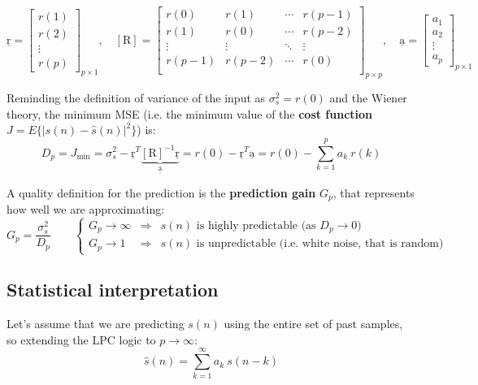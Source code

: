 \[ \underline{\mathrm{r}} = \left[
\begin{array}{c}
    r(1) \\
    r(2) \\
    \vdots \\
    r(p)
\end{array} \right]_{p \times 1}, \quad \left[\mathrm{R}\right] = \left[
\begin{array}{cccc}
    r(0) & r(1) & \cdots & r(p-1) \\
    r(1) & r(0) & \cdots & r(p-2) \\
    \vdots & \vdots & \ddots & \vdots \\
    r(p-1) & r(p-2) & \cdots & r(0) \\
\end{array} \right]_{p \times p}, \quad \underline{\mathrm{a}} = \left[
\begin{array}{c}
    a_1 \\
    a_2 \\
    \vdots \\
    a_p
\end{array} \right]_{p \times 1} \]

Reminding the definition of variance of the input as $ \sigma_s^2 = r(0) $ and the Wiener theory, the minimum MSE (i.e. the minimum value of the \textbf{cost function} $J = E\{|s(n) - \hat{s}(n)|^2\}$) is:
\[ D_p = J_{\min} = \sigma_s^2 - \underline{\mathrm{r}}^T \underbrace{\left[\mathrm{R}\right]^{-1} \underline{\mathrm{r}}}_{\underline{\mathrm{a}}} = r(0) - \underline{\mathrm{r}}^T \underline{\mathrm{a}} = r(0) - \sum_{k=1}^p a_k \ r(k) \]

A quality definition for the prediction is the \textbf{prediction gain} $G_p$, that represents how well we are approximating:
\[ G_p = \frac{\sigma_s^2}{D_p} \qquad \left\{
\begin{array}{ccl}
    G_p \rightarrow \infty & \Rightarrow & s(n) \text{ is highly predictable (as } D_p \rightarrow 0)  \\
    G_p \rightarrow 1 & \Rightarrow & s(n) \text{ is unpredictable (i.e. white noise, that is random)}
\end{array}
\right. \]

\subsection{Statistical interpretation}

Let’s assume that we are predicting $s(n)$ using the entire set of past samples, so extending the LPC logic to $p \rightarrow \infty $:
\[ \hat{s}(n) = \sum_{k=1}^{\infty} a_k \ s(n-k) \]

